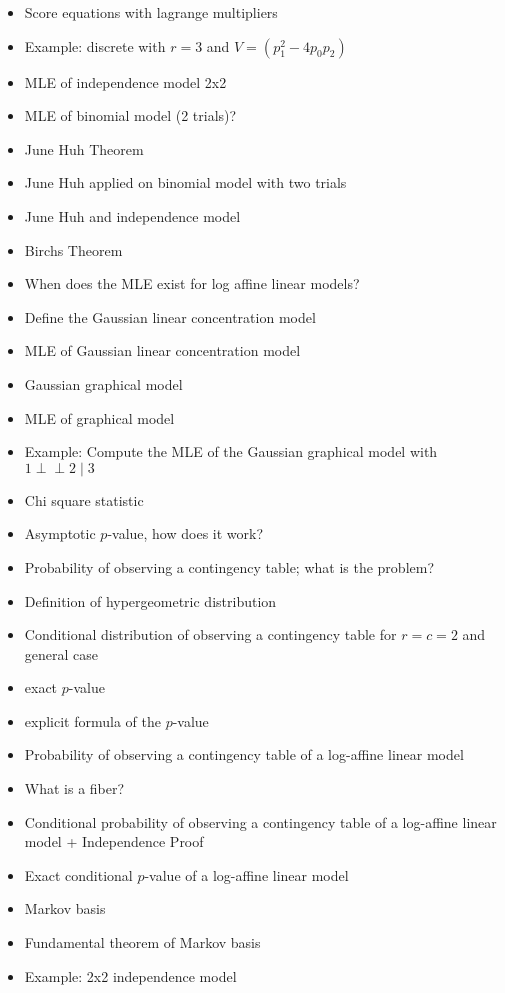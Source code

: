 \documentclass[a4paper, 11pt]{article}
\newcommand{\indep}{\perp \!\!\! \perp}
\begin{document}
\begin{itemize}
  \item Score equations with lagrange multipliers
  \item Example: discrete with \( r = 3 \) and \( V = ( p_1^2 - 
  4p_0p_2 ) \)
  \item MLE of independence model 2x2
  \item MLE of binomial model (2 trials)?
  \item June Huh Theorem
  \item June Huh applied on binomial model with two trials
  \item June Huh and independence model
  \item Birchs Theorem
  \item When does the MLE exist for log affine linear models?
  \item Define the Gaussian linear concentration model
  \item MLE of Gaussian linear concentration model 
  \item Gaussian graphical model
  \item MLE of graphical model
  \item Example: Compute the MLE of the Gaussian graphical model with \( 1 \indep 2 \mid 3 \)
  \item Chi square statistic
  \item Asymptotic \( p \)-value, how does it work?
  \item Probability of observing a contingency table; what is the problem?
  \item Definition of hypergeometric distribution
  \item Conditional distribution of observing a contingency table for \( r=c=2 \) and general case
  \item exact \( p \)-value
  \item explicit formula of the \( p \)-value
  \item Probability of observing a contingency table of a log-affine linear model
  \item What is a fiber?
  \item Conditional probability of observing a contingency table of a log-affine linear model + Independence Proof
  \item Exact conditional \( p \)-value of a log-affine linear model
  \item Markov basis
  \item Fundamental theorem of Markov basis
  \item Example: 2x2 independence model
\end{itemize}

\printindex
\end{document}

